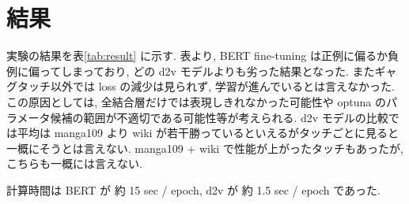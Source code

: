 \documentclass[twocolumn]{jarticle}     %
\begin{document}
\section{結果}
実験の結果を表\ref{tab:result} に示す.
表より, BERT fine-tuning は正例に偏るか負例に偏ってしまっており, どの d2v モデルよりも劣った結果となった. またギャグタッチ以外では loss の減少は見られず, 学習が進んでいるとは言えなかった. この原因としては, 全結合層だけでは表現しきれなかった可能性や optuna のパラメータ候補の範囲が不適切である可能性等が考えられる. d2v モデルの比較では平均は manga109 より wiki が若干勝っているといえるがタッチごとに見ると一概にそうとは言えない. manga109 + wiki で性能が上がったタッチもあったが, こちらも一概には言えない.

計算時間は BERT が 約 15 sec / epoch, d2v が 約 1.5 sec / epoch であった.
\end{document}
